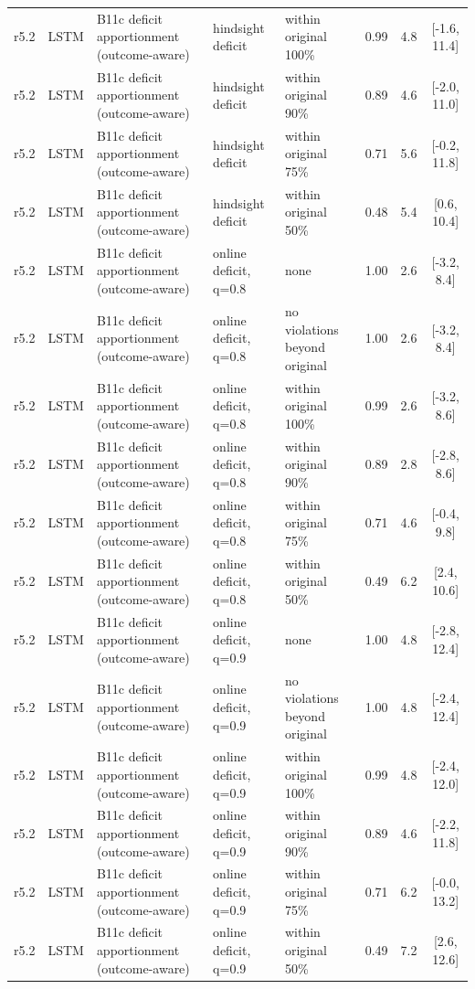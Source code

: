 \documentclass[10pt,onecolumn,letterpaper]{article}
\begin{document}
\begin{longtable}{lllp{4.2cm}p{3.4cm}ccc}
r5.2 & LSTM & B11c deficit apportionment (outcome-aware) & hindsight deficit & within original 100\% & 0.99 & 4.8 & [-1.6, 11.4] \\
r5.2 & LSTM & B11c deficit apportionment (outcome-aware) & hindsight deficit & within original 90\% & 0.89 & 4.6 & [-2.0, 11.0] \\
r5.2 & LSTM & B11c deficit apportionment (outcome-aware) & hindsight deficit & within original 75\% & 0.71 & 5.6 & [-0.2, 11.8] \\
r5.2 & LSTM & B11c deficit apportionment (outcome-aware) & hindsight deficit & within original 50\% & 0.48 & 5.4 & [0.6, 10.4] \\
r5.2 & LSTM & B11c deficit apportionment (outcome-aware) & online deficit, q=0.8 & none & 1.00 & 2.6 & [-3.2, 8.4] \\
r5.2 & LSTM & B11c deficit apportionment (outcome-aware) & online deficit, q=0.8 & no violations beyond original & 1.00 & 2.6 & [-3.2, 8.4] \\
r5.2 & LSTM & B11c deficit apportionment (outcome-aware) & online deficit, q=0.8 & within original 100\% & 0.99 & 2.6 & [-3.2, 8.6] \\
r5.2 & LSTM & B11c deficit apportionment (outcome-aware) & online deficit, q=0.8 & within original 90\% & 0.89 & 2.8 & [-2.8, 8.6] \\
r5.2 & LSTM & B11c deficit apportionment (outcome-aware) & online deficit, q=0.8 & within original 75\% & 0.71 & 4.6 & [-0.4, 9.8] \\
r5.2 & LSTM & B11c deficit apportionment (outcome-aware) & online deficit, q=0.8 & within original 50\% & 0.49 & 6.2 & [2.4, 10.6] \\
r5.2 & LSTM & B11c deficit apportionment (outcome-aware) & online deficit, q=0.9 & none & 1.00 & 4.8 & [-2.8, 12.4] \\
r5.2 & LSTM & B11c deficit apportionment (outcome-aware) & online deficit, q=0.9 & no violations beyond original & 1.00 & 4.8 & [-2.4, 12.4] \\
r5.2 & LSTM & B11c deficit apportionment (outcome-aware) & online deficit, q=0.9 & within original 100\% & 0.99 & 4.8 & [-2.4, 12.0] \\
r5.2 & LSTM & B11c deficit apportionment (outcome-aware) & online deficit, q=0.9 & within original 90\% & 0.89 & 4.6 & [-2.2, 11.8] \\
r5.2 & LSTM & B11c deficit apportionment (outcome-aware) & online deficit, q=0.9 & within original 75\% & 0.71 & 6.2 & [-0.0, 13.2] \\
r5.2 & LSTM & B11c deficit apportionment (outcome-aware) & online deficit, q=0.9 & within original 50\% & 0.49 & 7.2 & [2.6, 12.6] \\

\end{longtable}
\end{document}
